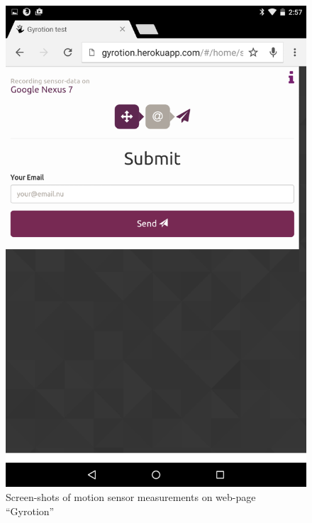 \begin{figure}[H]
\begin{minipage}[c]{.23\textwidth}
    \includegraphics[scale=0.1]{img/Nexus-submit}
  \end{minipage}
  \caption{Screen-shots of motion sensor measurements on web-page ``Gyrotion''}
  \label{fig:gyrotion}
\end{figure}

